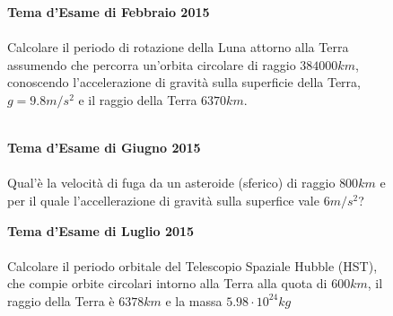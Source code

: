 \begin{figure}[h!]
\textbf{Tema d'Esame di Febbraio 2015}\\ \\
Calcolare il periodo di rotazione della Luna attorno alla Terra assumendo che percorra un'orbita circolare di raggio $384000 km$, conoscendo l'accelerazione di gravità sulla superficie della Terra, $g = 9.8 m/s^2$ e il raggio della Terra $6370 km$. \\ \\
\noindent{}	
\end{figure}

\begin{figure}[h!]
\textbf{Tema d'Esame di Giugno 2015}\\ \\
Qual'è la velocità di fuga da un asteroide (sferico) di raggio $800km$ e per il quale l'accellerazione di gravità sulla superfice vale $6m/s^2$?
\end{figure}

\begin{figure}[h!]
\textbf{Tema d'Esame di Luglio 2015}\\ \\
Calcolare il periodo orbitale del Telescopio Spaziale Hubble (HST), che compie orbite circolari intorno alla Terra alla quota di $600km$, il raggio della Terra è $6378km$ e la massa $5.98\cdot 10^{24}kg$
\end{figure}